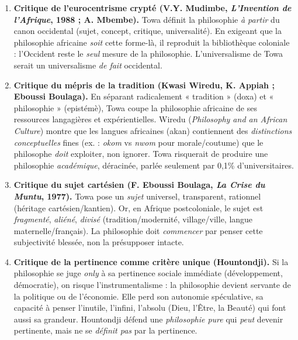 \documentclass[11pt]{article}
\newcommand{\cle}[1]{{\popxbold\color{popdark}#1}}
\begin{document}
\begin{attention}
\begin{enumerate}
    \item \textbf{Critique de l'\cle{eurocentrisme crypté} (V.Y. Mudimbe, \emph{L'Invention de l'Afrique}, 1988 ; A. Mbembe).}
    Towa définit la philosophie \emph{à partir} du canon occidental (sujet, concept, critique, universalité). En exigeant que la philosophie africaine \emph{soit} cette forme-là, il reproduit la \cle{bibliothèque coloniale} : l'Occident reste le \emph{seul} mesure de la philosophie. L'universalisme de Towa serait un universalisme \emph{de fait} occidental.
    \item \textbf{Critique du \cle{mépris de la tradition} (Kwasi Wiredu, K. Appiah ; Eboussi Boulaga).}
    En séparant radicalement « tradition » (doxa) et « philosophie » (epistémè), Towa coupe la philosophie africaine de ses ressources langagières et expérientielles. Wiredu (\emph{Philosophy and an African Culture}) montre que les langues africaines (akan) contiennent des \emph{distinctions conceptuelles} fines (ex. : \emph{okom} vs \emph{nwom} pour morale/coutume) que le philosophe \emph{doit} exploiter, non ignorer. Towa risquerait de produire une philosophie \emph{académique}, déracinée, parlée seulement par 0,1\% d'universitaires.
    \item \textbf{Critique du \cle{sujet cartésien} (F. Eboussi Boulaga, \emph{La Crise du Muntu}, 1977).}
    Towa pose un \emph{sujet} universel, transparent, rationnel (héritage cartésien/kantien). Or, en Afrique postcoloniale, le sujet est \emph{fragmenté}, \emph{aliéné}, \emph{divisé} (tradition/modernité, village/ville, langue maternelle/français). La philosophie doit \emph{commencer} par penser cette subjectivité blessée, non la présupposer intacte.
    \item \textbf{Critique de la \cle{pertinence} comme critère unique (Hountondji).}
    Si la philosophie se juge \emph{only} à sa pertinence sociale immédiate (développement, démocratie), on risque l'\cle{instrumentalisme} : la philosophie devient servante de la politique ou de l'économie. Elle perd son autonomie spéculative, sa capacité à penser l'inutile, l'infini, l'absolu (Dieu, l'Être, la Beauté) qui font aussi sa grandeur. Hountondji défend une \emph{philosophie pure} qui \emph{peut} devenir pertinente, mais ne se \emph{définit pas} par la pertinence.
\end{enumerate}
\end{attention}
\end{document}

